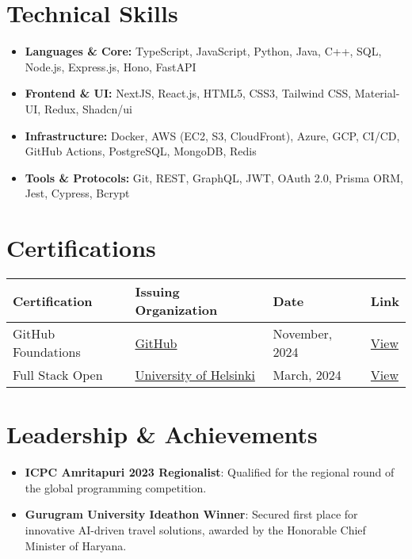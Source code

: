 \documentclass[letterpaper,11pt]{article}
\begin{document}
\section{Technical Skills}
\begin{itemize}[leftmargin=*,itemsep=0pt,parsep=0pt,topsep=0pt,partopsep=0pt]
	\item \textbf{Languages \& Core:} TypeScript, JavaScript, Python, Java, C++, SQL, Node.js, Express.js, Hono, FastAPI
	\item \textbf{Frontend \& UI:} NextJS, React.js, HTML5, CSS3, Tailwind CSS, Material-UI, Redux, Shadcn/ui
	\item \textbf{Infrastructure:} Docker, AWS (EC2, S3, CloudFront), Azure, GCP, CI/CD, GitHub Actions, PostgreSQL, MongoDB, Redis
	\item \textbf{Tools \& Protocols:} Git, REST, GraphQL, JWT, OAuth 2.0, Prisma ORM, Jest, Cypress, Bcrypt
\end{itemize}
\vspace{-6pt}

\section{Certifications}
\vspace{-8pt}
\begin{table}[h!]
	\renewcommand{\arraystretch}{1.5}
	\setlength{\tabcolsep}{6pt}
	\begin{tabularx}{\linewidth}{|X|X|l|l|}
		\hline
		\textbf{Certification} & \textbf{Issuing Organization}                             & \textbf{Date}  & \textbf{Link} \\
		\hline
		GitHub Foundations     & \href{https://github.com}{GitHub}                         & November, 2024 &
		\href{https://www.credly.com/badges/0d980c06-511c-4e3d-a9a7-9973688b34ad}{View}                                     \\
		\hline
		Full Stack Open        & \href{https://www.helsinki.fi/en}{University of Helsinki} & March, 2024    &
		\href{https://studies.cs.helsinki.fi/stats/api/certificate/fullstackopen/en/YOUR-CERT-ID}{View}                     \\
		\hline
	\end{tabularx}
\end{table}
\vspace{-14pt}

\section{Leadership \& Achievements}
\begin{itemize}[leftmargin=*,itemsep=0pt,parsep=0pt,topsep=0pt,partopsep=0pt]
	\item \textbf{ICPC Amritapuri 2023 Regionalist}: Qualified for the regional round of the global programming competition.
	\item \textbf{Gurugram University Ideathon Winner}: Secured first place for innovative AI-driven travel solutions, awarded by the Honorable Chief Minister of Haryana.
\end{itemize}
\end{document}
